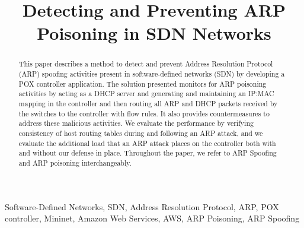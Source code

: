 \documentclass[conference]{IEEEtran}
\begin{document}
\title{Detecting and Preventing ARP Poisoning in SDN Networks}

\author{
	\and
	\and
}

\maketitle


\begin{abstract}
This paper describes a method to detect and prevent Address Resolution Protocol (ARP) spoofing activities present in software-defined networks (SDN) by developing a POX controller application. The solution presented monitors for ARP poisoning activities by acting as a DHCP server and generating and maintaining an IP:MAC mapping in the controller and then routing all ARP and DHCP packets received by the switches to the controller with flow rules. It also provides countermeasures to address these malicious activities. We evaluate the performance by verifying consistency of host routing tables during and following an ARP attack, and we evaluate the additional load that an ARP attack places on the controller both with and without our defense in place. Throughout the paper, we refer to ARP Spoofing and ARP poisoning interchangeably.\\
\end{abstract}

\begin{IEEEkeywords}
Software-Defined Networks, SDN, Address Resolution Protocol, ARP, POX controller, Mininet, Amazon Web Services, AWS, ARP Poisoning, ARP Spoofing
\end{IEEEkeywords}
\end{document}
